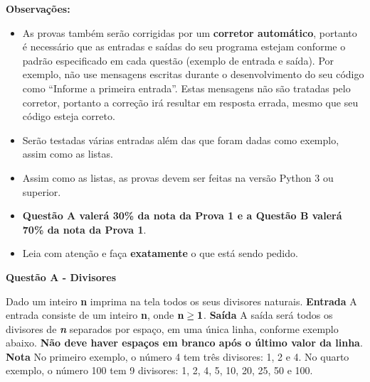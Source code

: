 \documentclass[a4paper, 12pt]{article}
\begin{document}
\textbf{{\large Observações:}}
\begin{itemize}
	\item As provas também serão corrigidas por um \textbf{corretor automático}, portanto é necessário que as entradas e saídas do seu programa estejam conforme o padrão especificado em cada questão (exemplo de entrada e saída). Por exemplo, não use mensagens escritas durante o desenvolvimento do seu código como “Informe a primeira entrada”. Estas mensagens não são tratadas pelo corretor, portanto a correção irá resultar em resposta errada, mesmo que seu código esteja correto.
	\item Serão testadas várias entradas além das que foram dadas como exemplo, assim como as listas.
	\item Assim como as listas, as provas devem ser feitas na versão Python 3 ou superior.
	\item \textbf{Questão A valerá 30\% da nota da Prova 1 e a Questão B valerá 70\% da nota da Prova 1}.
	\item Leia com atenção e faça \textbf{exatamente} o que está sendo pedido.
\end{itemize}
\newpage %
\begin{center}
\textbf{{\Large Questão A - Divisores}}
\end{center}
\vspace{5pt}
Dado um inteiro \textbf{n} imprima na tela todos os seus divisores naturais.
\newline \newline
\textbf{{\large Entrada}} \newline
A entrada consiste de um inteiro \textbf{n}, onde $\textrm{\textbf{n}} \geq \textrm{\textbf{1}}$.
\newline \newline
\textbf{{\large Saída}} \newline
A saída será todos os divisores de \textbf{\textit{n}} separados por espaço, em uma única linha, conforme exemplo abaixo. \textbf{Não deve haver espaços em branco após o último valor da linha}.
\newline \newline
\textbf{{\large Nota}} \newline
No primeiro exemplo, o número 4 tem três divisores: 1, 2 e 4. \newline
No quarto exemplo, o número 100 tem 9 divisores: 1, 2, 4, 5, 10, 20, 25, 50 e 100.
\newline
\end{document}
